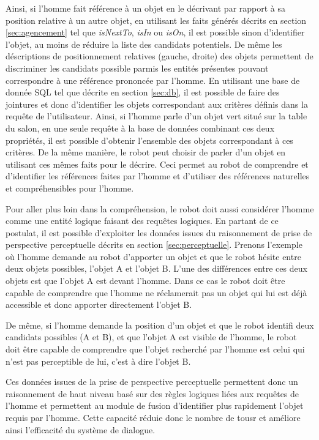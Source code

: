 \documentclass[a4paper,11pt,twoside]{StyleThese}
\begin{document}
Ainsi, si l'homme fait référence à un objet en le décrivant par rapport à sa position relative à un autre objet, en utilisant les faits générés décrits en section \ref{sec:agencement} tel que \textit{isNextTo}, \textit{isIn} ou \textit{isOn}, il est possible sinon d'identifier l'objet, au moins de réduire la liste des candidats potentiels. De même les déscriptions de positionnement relatives (gauche, droite) des objets permettent de discriminer les candidats possible parmis les entités présentes pouvant correspondre à une référence prononcée par l'homme.
En utilisant une base de donnée SQL tel que décrite en section \ref{sec:db}, il est possible de faire des jointures et donc d'identifier les objets correspondant aux critères définis dans la requête de l'utilisateur.
Ainsi, si l'homme parle d'un objet vert situé sur la table du salon, en une seule requête à la base de données combinant ces deux propriétés, il est possible d'obtenir l'ensemble des objets correspondant à ces critères.
De la même manière, le robot peut choisir de parler d'un objet en utilisant ces mêmes faits pour le décrire.
Ceci permet au robot de comprendre et d'identifier les références faites par l'homme et d'utiliser des références naturelles et compréhensibles pour l'homme.

Pour aller plus loin dans la compréhension, le robot doit aussi considérer l'homme comme une entité logique faisant des requêtes logiques. En partant de ce postulat, il est possible d'exploiter les données issues du raisonnement de prise de perspective perceptuelle décrits en section \ref{sec:perceptuelle}.
Prenons l'exemple où l'homme demande au robot d'apporter un objet et que le robot hésite entre deux objets possibles, l'objet A et l'objet B. L'une des différences entre ces deux objets est que l'objet A est devant l'homme. Dans ce cas le robot doit être capable de comprendre que l'homme ne réclamerait pas un objet qui lui est déjà accessible et donc apporter directement l'objet B.

De même, si l'homme demande la position d'un objet et que le robot identifi deux candidats possibles (A et B), et que l'objet A est visible de l'homme, le robot doit être capable de comprendre que l'objet recherché par l'homme est celui qui n'est pas perceptible de lui, c'est à dire l'objet B.

Ces données issues de la prise de perspective perceptuelle permettent donc un raisonnement de haut niveau basé sur des règles logiques liées aux requêtes de l'homme et permettent au module de fusion d'identifier plus rapidement l'objet requis par l'homme. Cette capacité réduie donc le nombre de tousr et améliore ainsi l'efficacité du système de dialogue.
\end{document}
